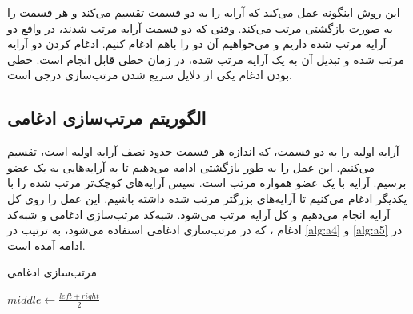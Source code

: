 \documentclass[12pt]{article}
\begin{document}
این روش اینگونه عمل می‌کند که آرایه را به دو قسمت تقسیم می‌کند و هر قسمت را به صورت بازگشتی مرتب می‌کند.
وقتی که دو قسمت آرایه مرتب شدند، در واقع دو آرایه مرتب شده داریم و می‌خواهیم آن دو را باهم ادغام کنیم.
ادغام کردن دو آرایه مرتب شده و تبدیل آن به یک آرایه مرتب شده، در زمان خطی
قابل انجام است. خطی بودن ادغام یکی از دلایل سریع شدن مرتب‌سازی درجی است.

\subsection*{الگوریتم مرتب‌سازی ادغامی}
آرایه اولیه را به دو قسمت، که اندازه هر قسمت حدود نصف آرایه اولیه است، تقسیم می‌کنیم.
این عمل را به طور بازگشتی ادامه می‌دهیم تا به آرایه‌هایی به یک عضو برسیم.
آرایه با یک عضو همواره مرتب است.
سپس آرایه‌های کوچک‌تر مرتب شده را با یکدیگر ادغام می‌کنیم تا آرایه‌های بزرگتر مرتب شده داشته باشیم.
این عمل را روی کل آرایه انجام می‌دهیم و کل آرایه مرتب می‌شود.
شبه‌کد مرتب‌سازی ادغامی و شبه‌کد ادغام
، که در مرتب‌سازی ادغامی استفاده می‌شود،
به ترتیب در
\cref{alg:a4}
و
\cref{alg:a5}
در ادامه آمده است.
\begin{algorithm}[H]
  \caption{مرتب‌سازی ادغامی}
  \label{alg:a4}
  \begin{latin}
    \begin{algorithmic}[1]
      \State $middle \gets \frac{{left + right}}{2}$
      \State {}
      \State {}
      \State {}
      \EndIf
      \EndProcedure
    \end{algorithmic}
  \end{latin}
\end{algorithm}
\end{document}
